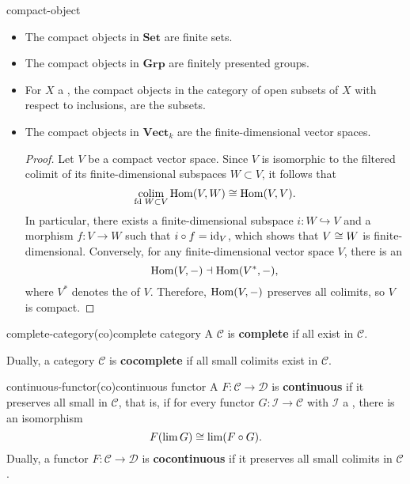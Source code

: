 \begin{example}{compact-object}
    \begin{itemize}
        \item The compact objects in $\textbf{Set}$ are finite sets.
        \item The compact objects in $\textbf{Grp}$ are finitely presented groups.
        \item For $X$ a , the compact objects in the category of open subsets of $X$ with respect to inclusions, are the  subsets.
        \item The compact objects in $\textbf{Vect}_k$ are the finite-dimensional vector spaces.
        \begin{proof}
            Let $V$ be a compact vector space. Since $V$ is isomorphic to the filtered colimit of its finite-dimensional subspaces $W \subset V$, it follows that
            \[ \underset{\textup{fd } W \subset V}{\operatorname{colim}} \operatorname{Hom}(V, W) \cong \operatorname{Hom}(V, V) . \]
            In particular, there exists a finite-dimensional subspace $i \colon W \hookrightarrow V$ and a morphism $f \colon V \to W$ such that $i \circ f = \textup{id}_V$, which shows that $V \cong W$ is finite-dimensional. Conversely, for any finite-dimensional vector space $V$, there is an 
            \[ \operatorname{Hom}(V, -) \dashv \operatorname{Hom}(V^*, -) , \]
            where $V^*$ denotes the  of $V$. Therefore, $\operatorname{Hom}(V, - )$ preserves all colimits, so $V$ is compact.
        \end{proof}
    \end{itemize}
\end{example}

\begin{topic}{complete-category}{(co)complete category}
    A  $\mathcal{C}$ is \textbf{complete} if all   exist in $\mathcal{C}$.
    
    Dually, a category $\mathcal{C}$ is \textbf{cocomplete} if all small colimits exist in $\mathcal{C}$.
\end{topic}

\begin{topic}{continuous-functor}{(co)continuous functor}
    A  $F \colon \mathcal{C} \to \mathcal{D}$ is \textbf{continuous} if it preserves all small  in $\mathcal{C}$, that is, if for every functor $G \colon \mathcal{I} \to \mathcal{C}$ with $\mathcal{I}$ a , there is an isomorphism
    \[ F(\lim G) \cong \lim(F \circ G) . \]
    Dually, a functor $F \colon \mathcal{C} \to \mathcal{D}$ is \textbf{cocontinuous} if it preserves all small colimits in $\mathcal{C}$.
\end{topic}

